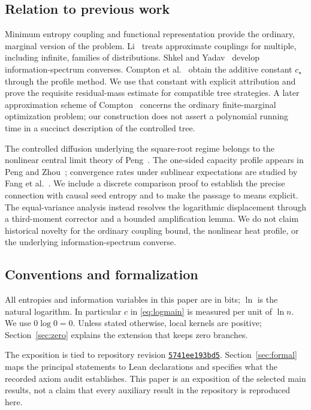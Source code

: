 \documentclass[11pt,a4paper]{article}
\theoremstyle{definition}\newtheorem{definition}[theorem]{Definition}
\theoremstyle{remark}\newtheorem{remark}[theorem]{Remark}
\numberwithin{equation}{section}
\begin{document}
\subsection{Relation to previous work}
Minimum entropy coupling and functional representation provide the
ordinary, marginal version of the problem. Li~\cite{li} treats approximate
couplings for multiple, including infinite, families of distributions.
Shkel and Yadav~\cite{shkel} develop information-spectrum converses.
Compton et al.~\cite{compton} obtain the additive constant $c_\star$ through
the profile method. We use that constant with explicit attribution and
prove the requisite residual-mass estimate for compatible tree strategies.
A later approximation scheme of Compton~\cite{ptas} concerns the ordinary
finite-marginal optimization problem; our construction does not assert a
polynomial running time in a succinct description of the controlled tree.

The controlled diffusion underlying the square-root regime belongs to the
nonlinear central limit theory of Peng~\cite{peng}. The one-sided capacity
profile appears in Peng and Zhou~\cite{pz}; convergence rates under
sublinear expectations are studied by Fang et al.~\cite{fang}. We include
a discrete comparison proof to establish the precise connection with
causal seed entropy and to make the passage to means explicit.
The equal-variance analysis instead resolves the logarithmic displacement
through a third-moment corrector and a bounded amplification lemma.
We do not claim historical novelty for the ordinary coupling bound, the
nonlinear heat profile, or the underlying information-spectrum converse.

\subsection{Conventions and formalization}
All entropies and information variables in this paper are in bits;
$\ln$ is the natural logarithm. In particular $c$ in
\eqref{eq:logmain} is measured per unit of $\ln n$.
We use $0\log 0=0$. Unless stated otherwise, local kernels are positive;
Section~\ref{sec:zero} explains the extension that keeps zero branches.

The exposition is tied to repository revision
\href{https://github.com/jendamikulik/finite-Shannon-theorem/tree/5741ee193bd5ff7f4addd4c09b2d65edfe238c20}{\texttt{5741ee193bd5}}.
Section~\ref{sec:formal} maps the principal statements to Lean declarations
and specifies what the recorded axiom audit establishes. This paper is an
exposition of the selected main results, not a claim that every auxiliary
result in the repository is reproduced here.
\end{document}
